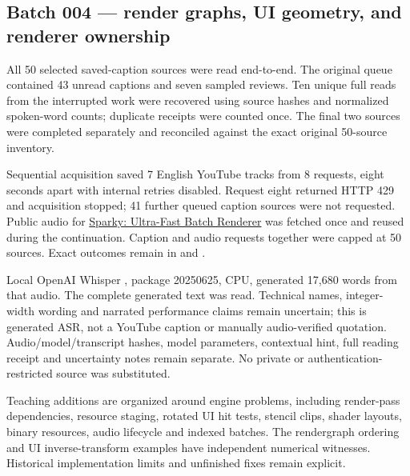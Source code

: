 \subsection{Batch 004 --- render graphs, UI geometry, and renderer ownership}\label{appendix-877738f6f4d2-batch-004-render-graphs-ui-geometry-and-renderer-ownership}

\hypertarget{appendix-877738f6f4d2-batch-004-render-graphs-ui-geometry-and-renderer-ownership}{}

All 50 selected saved-caption sources were read end-to-end. The original queue contained 43 unread captions and seven sampled reviews. Ten unique full reads from the interrupted work were recovered using source hashes and normalized spoken-word counts; duplicate receipts were counted once. The final two sources were completed separately and reconciled against the exact original 50-source inventory.

Sequential acquisition saved 7 English YouTube tracks from 8 requests, eight seconds apart with internal retries disabled. Request eight returned HTTP 429 and acquisition stopped; 41 further queued caption sources were not requested. Public audio for \href{https://www.youtube.com/watch?v=ImtWD_9OAeY}{Sparky: Ultra-Fast Batch Renderer} was fetched once and reused during the continuation. Caption and audio requests together were capped at 50 sources. Exact outcomes remain in  and .

Local OpenAI Whisper , package 20250625, CPU, generated 17,680 words from that audio. The complete generated text was read. Technical names, integer-width wording and narrated performance claims remain uncertain; this is generated ASR, not a YouTube caption or manually audio-verified quotation. Audio/model/transcript hashes, model parameters, contextual hint, full reading receipt and uncertainty notes remain separate. No private or authentication-restricted source was substituted.

Teaching additions are organized around engine problems, including render-pass dependencies, resource staging, rotated UI hit tests, stencil clips, shader layouts, binary resources, audio lifecycle and indexed batches. The rendergraph ordering and UI inverse-transform examples have independent numerical witnesses. Historical implementation limits and unfinished fixes remain explicit.


